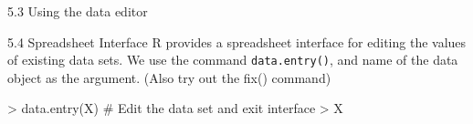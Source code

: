 
 5.3 Using the data editor
 
 
 
 5.4 Spreadsheet Interface
 R provides a spreadsheet interface for editing the values of existing data sets. We use the
 command \texttt{data.entry()}, and name of the data object as the argument. (Also try out the
 fix() command)
 \begin{framed}
 \begin{semiverbatim}
 > data.entry(X) # Edit the data set and exit interface
 > X
 \end{semiverbatim}
 \end{framed}
 
 
 
 
 
 
 

